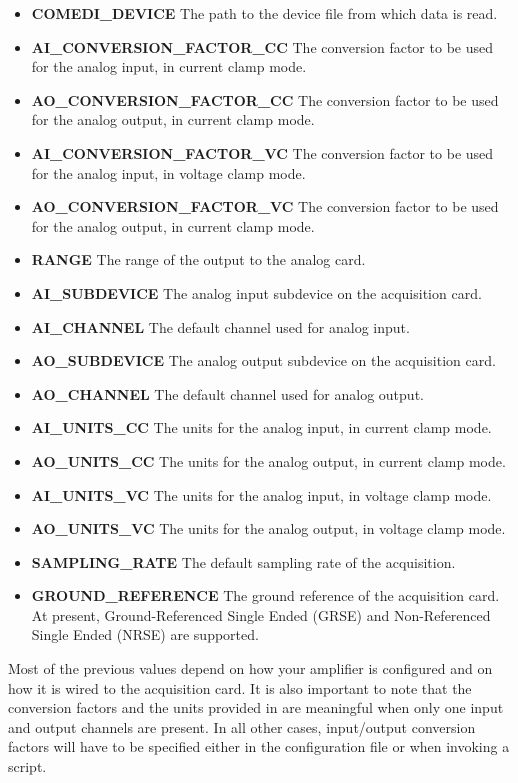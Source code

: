 \begin{itemize}
\item \textbf{COMEDI\_DEVICE} The path to the device file from which
  data is read.
\item \textbf{AI\_CONVERSION\_FACTOR\_CC} The conversion factor to be used for
  the analog input, in current clamp mode.
\item \textbf{AO\_CONVERSION\_FACTOR\_CC} The conversion factor to be used for
  the analog output, in current clamp mode.
\item \textbf{AI\_CONVERSION\_FACTOR\_VC} The conversion factor to be used for
  the analog input, in voltage clamp mode.
\item \textbf{AO\_CONVERSION\_FACTOR\_VC} The conversion factor to be used for
  the analog output, in current clamp mode.
\item \textbf{RANGE} The range of the output to the analog card.
\item \textbf{AI\_SUBDEVICE} The analog input subdevice on the
  acquisition card.
\item \textbf{AI\_CHANNEL} The default channel used for analog input.
\item \textbf{AO\_SUBDEVICE} The analog output subdevice on the
  acquisition card.
\item \textbf{AO\_CHANNEL} The default channel used for analog output.
\item \textbf{AI\_UNITS\_CC} The units for the analog input, in current
  clamp mode.
\item \textbf{AO\_UNITS\_CC} The units for the analog output, in current
  clamp mode.
\item \textbf{AI\_UNITS\_VC} The units for the analog input, in voltage
  clamp mode.
\item \textbf{AO\_UNITS\_VC} The units for the analog output, in voltage
  clamp mode.
\item \textbf{SAMPLING\_RATE} The default sampling rate of the acquisition.
\item \textbf{GROUND\_REFERENCE} The ground reference of the
  acquisition card. At present, Ground-Referenced Single Ended (GRSE)
  and Non-Referenced Single Ended (NRSE) are supported.
\end{itemize}
Most of the previous values depend on how your amplifier is configured
and on how it is wired to the acquisition card. It is also important to
note that the conversion factors and the units provided in
 are meaningful when only one input and output
channels are present. In all other cases, input/output conversion
factors will have to be specified either in the configuration file or
when invoking a script.

